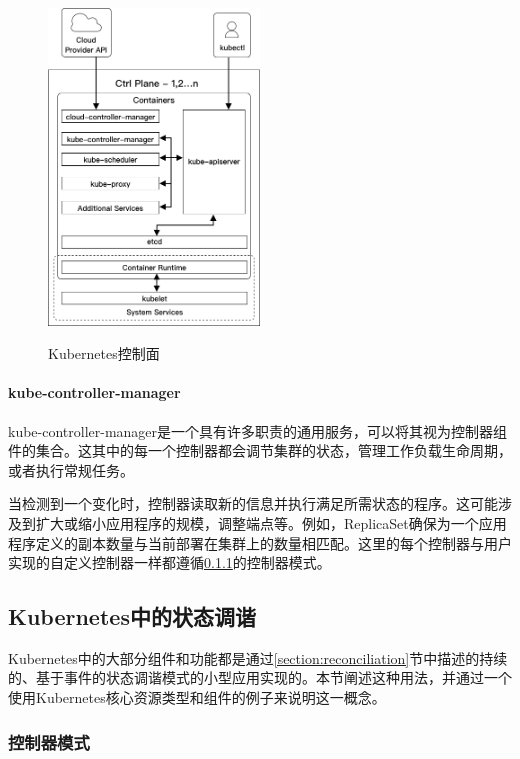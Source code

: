 \documentclass[macfonts,master]{njuthesis}
\begin{document}
\begin{figure}[htbp]
  \centering
  \includegraphics[width= 0.5\textwidth]{pics/K8s-ctrl-plane.png}\\
  \caption{Kubernetes控制面\cite{gorillaguide}}\label{fig:k8s-ctrl}
\end{figure}


\paragraph{kube-controller-manager}
kube-controller-manager是一个具有许多职责的通用服务，可以将其视为控制器组件的集合。这其中的每一个控制器都会调节集群的状态，管理工作负载生命周期，或者执行常规任务\cite{gorillaguide}。

当检测到一个变化时，控制器读取新的信息并执行满足所需状态的程序。这可能涉及到扩大或缩小应用程序的规模，调整端点等。例如，ReplicaSet确保为一个应用程序定义的副本数量与当前部署在集群上的数量相匹配。这里的每个控制器与用户实现的自定义控制器一样都遵循\ref{section:controller-pattern}的控制器模式。

\subsection{Kubernetes中的状态调谐}

Kubernetes中的大部分组件和功能都是通过\ref{section:reconciliation}节中描述的持续的、基于事件的状态调谐模式的小型应用实现的。本节阐述这种用法，并通过一个使用Kubernetes核心资源类型和组件的例子来说明这一概念。

\subsubsection{控制器模式}\label{section:controller-pattern}
\end{document}
